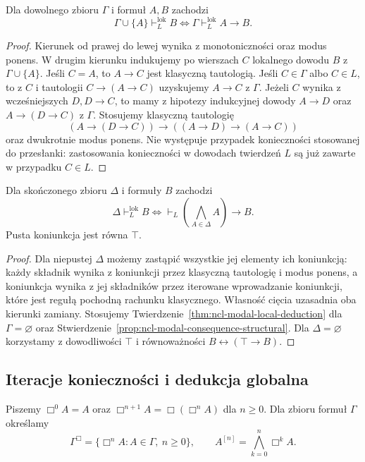 \begin{twierdzenie}
\label{thm:ncl-modal-local-deduction}
Dla dowolnego zbioru $\Gamma$ i formuł $A,B$
zachodzi
\[
 \Gamma\cup\{A\}\vdash_L^{\mathrm{lok}} B
 \iff \Gamma\vdash_L^{\mathrm{lok}} A\to B.
\]
\end{twierdzenie}
\begin{proof}
Kierunek od prawej do lewej wynika
z monotoniczności oraz modus ponens.
W drugim kierunku indukujemy po wierszach $C$
lokalnego dowodu $B$ z $\Gamma\cup\{A\}$.
Jeśli $C=A$, to $A\to C$ jest klasyczną
tautologią.
Jeśli $C\in\Gamma$ albo $C\in L$, to
z $C$ i tautologii $C\to(A\to C)$ uzyskujemy
$A\to C$ z $\Gamma$.
Jeżeli $C$ wynika z wcześniejszych $D,D\to C$,
to mamy z hipotezy indukcyjnej dowody
$A\to D$ oraz $A\to(D\to C)$ z $\Gamma$.
Stosujemy klasyczną tautologię
\[
 (A\to(D\to C))\to((A\to D)\to(A\to C))
\]
oraz dwukrotnie modus ponens.
Nie występuje przypadek konieczności
stosowanej do przesłanki: zastosowania
konieczności w dowodach twierdzeń $L$
są już zawarte w przypadku $C\in L$.
\end{proof}

\begin{wniosek}
\label{cor:ncl-modal-local-finite}
Dla skończonego zbioru $\Delta$ i formuły $B$
zachodzi
\[
 \Delta\vdash_L^{\mathrm{lok}} B
 \iff
 \vdash_L \left(\bigwedge_{A\in\Delta} A\right)\to B.
\]
Pusta koniunkcja jest równa $\top$.
\end{wniosek}
\begin{proof}
Dla niepustej $\Delta$ możemy zastąpić wszystkie
jej elementy ich koniunkcją: każdy składnik
wynika z koniunkcji przez klasyczną tautologię
i modus ponens, a koniunkcja wynika z jej
składników przez iterowane wprowadzanie
koniunkcji, które jest regułą pochodną rachunku
klasycznego. Własność cięcia uzasadnia oba
kierunki zamiany.
Stosujemy Twierdzenie~\ref{thm:ncl-modal-local-deduction}
dla $\Gamma=\varnothing$ oraz
Stwierdzenie~\ref{prop:ncl-modal-consequence-structural}.
Dla $\Delta=\varnothing$ korzystamy z dowodliwości
$\top$ i równoważności $B\leftrightarrow(\top\to B)$.
\end{proof}

\subsection{Iteracje konieczności i dedukcja globalna}

\begin{definicja}
\label{def:ncl-modal-box-closure}
Piszemy $\Box^0 A=A$ oraz
$\Box^{n+1}A=\Box(\Box^n A)$ dla $n\geq0$.
Dla zbioru formuł $\Gamma$ określamy
\[
 \Gamma^\Box=\{\Box^n A:A\in\Gamma,\ n\geq0\},
 \qquad
 A^{[n]}=\bigwedge_{k=0}^n\Box^k A.
\]
\end{definicja}

